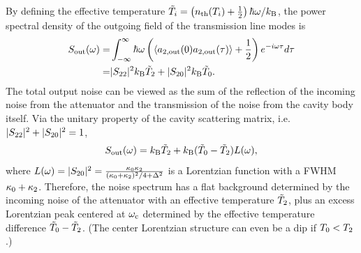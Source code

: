 \documentclass[%
reprint, %
superscriptaddress,
 amsmath,amssymb,
 aps
]{revtex4-2}
\begin{document}
By defining the effective temperature $\Tilde{T}_i = \left( n_{\rm th}(T_i) + \frac{1}{2} \right) \hbar\omega/k_{\rm B}$,
the power spectral density of the outgoing field of the transmission line 
modes is
\begin{equation}
\label{eq:spectrum_relation}
\begin{aligned}
    S_{\rm out}(\omega) 
    =& \int_{-\infty}^{\infty} \hbar\omega \left(\langle a_{2,\rm out}(0) a_{2,\rm out}(\tau) \rangle + \frac{1}{2} \right) e^{-i\omega\tau} d\tau \\
    =& |S_{\rm 22}|^2 k_{\rm B} \Tilde{T}_2 + |S_{\rm 20}|^2 k_{\rm B} \Tilde{T}_0.
\end{aligned}
\end{equation}
The total output noise can be viewed as the sum of the reflection of the 
incoming noise from the attenuator and the transmission of the noise from the 
cavity body itself.
Via the unitary property of 
the cavity scattering matrix, i.e. $|S_{\rm 22}|^2+|S_{\rm 20}|^2=1$,
\begin{equation}
\label{eq:spectrum_relation_Lorentz}
\begin{aligned}
    S_{\rm out}(\omega) =  k_{\rm B} \Tilde{T}_2 + k_{\rm B} (\Tilde{T}_0 - \Tilde{T}_2) L(\omega),
\end{aligned}
\end{equation}
where $L(\omega) = |S_{\rm 20}|^2 = \frac {\kappa_0 \kappa_{\rm 2}}  {(\kappa_0+\kappa_{\rm 2})^2/4 + \Delta^2}$ is a Lorentzian function with a FWHM 
$\kappa_0+\kappa_{\rm 2}$. Therefore, the noise spectrum has a flat background
 determined by the incoming noise of the attenuator with an effective 
temperature $\Tilde{T}_{\rm 2}$, plus an excess Lorentzian peak centered at 
$\omega_{\rm c}$ determined by the effective temperature difference 
$\Tilde{T}_{\rm 0} - \Tilde{T}_{\rm 2}$. (The center Lorentzian structure 
can even be a dip if ${T}_{\rm 0} < {T}_{\rm 2}$.)
\end{document}
